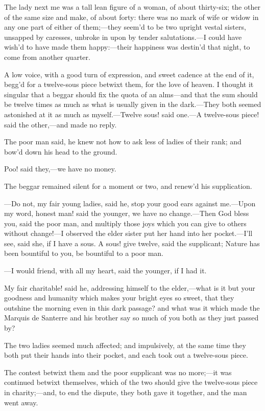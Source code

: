 \documentclass[twoside]{article}
\begin{document}
The lady next me was a tall lean figure of a woman, of about thirty-six;
the other of the same size and make, of about forty: there was no mark of
wife or widow in any one part of either of them;—they seem’d to be two
upright vestal sisters, unsapped by caresses, unbroke in upon by tender
salutations.—I could have wish’d to have made them happy:—their happiness
was destin’d that night, to come from another quarter.

A low voice, with a good turn of expression, and sweet cadence at the end
of it, begg’d for a twelve-sous piece betwixt them, for the love of
heaven.  I thought it singular that a beggar should fix the quota of an
alms—and that the sum should be twelve times as much as what is usually
given in the dark.—They both seemed astonished at it as much as
myself.—Twelve sous! said one.—A twelve-sous piece! said the other,—and
made no reply.

The poor man said, he knew not how to ask less of ladies of their rank;
and bow’d down his head to the ground.

Poo! said they,—we have no money.

The beggar remained silent for a moment or two, and renew’d his
supplication.

—Do not, my fair young ladies, said he, stop your good ears against
me.—Upon my word, honest man! said the younger, we have no change.—Then
God bless you, said the poor man, and multiply those joys which you can
give to others without change!—I observed the elder sister put her hand
into her pocket.—I’ll see, said she, if I have a sous.  A sous! give
twelve, said the supplicant; Nature has been bountiful to you, be
bountiful to a poor man.

—I would friend, with all my heart, said the younger, if I had it.

My fair charitable! said he, addressing himself to the elder,—what is it
but your goodness and humanity which makes your bright eyes so sweet,
that they outshine the morning even in this dark passage? and what was it
which made the Marquis de Santerre and his brother say so much of you
both as they just passed by?

The two ladies seemed much affected; and impulsively, at the same time
they both put their hands into their pocket, and each took out a
twelve-sous piece.

The contest betwixt them and the poor supplicant was no more;—it was
continued betwixt themselves, which of the two should give the
twelve-sous piece in charity;—and, to end the dispute, they both gave it
together, and the man went away.
\end{document}
